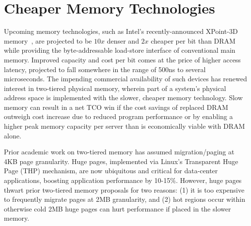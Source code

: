 \section{Cheaper Memory Technologies}
Upcoming memory technologies, such as Intel's recently-announced XPoint-3D
memory~\cite{xpoint}, are projected to be $10x$ denser and $2x$ cheaper per
bit than DRAM while providing the byte-addressable load-store interface of
conventional main memory.  Improved capacity and cost per bit comes at the price
of higher access latency, projected to fall somewhere in the range of 500ns to
several microseconds.  The impending commercial availability of such devices has
renewed interest in two-tiered physical memory, wherein part of a system's
physical address space is implemented with the slower, cheaper memory
technology.  Slow memory can result in a net TCO win if the cost savings of
replaced DRAM outweigh cost increase due to reduced program performance or by
enabling a higher peak memory capacity per server than is economically viable
with DRAM alone.  



Prior academic work on two-tiered memory has assumed migration/paging at 4KB
page granularity.  Huge pages, implemented via Linux's Transparent Huge Page
(THP) mechanism, are now ubiquitous and critical for data-center applications,
boosting application performance by 10-15\%.
However, huge pages thwart prior two-tiered memory proposals for two reasons:
(1) it is too expensive to frequently migrate pages at 2MB granularity, and (2)
hot regions occur within otherwise cold 2MB huge pages can hurt performance if
placed in the slower memory. 


